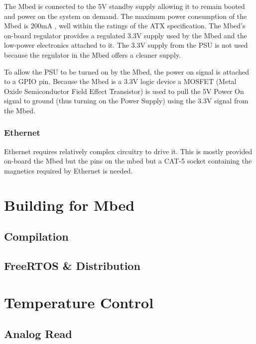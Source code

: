 				The Mbed is connected to the 5V standby supply allowing it to remain
				booted and power on the system on demand. The maximum power consumption
				of the Mbed is 200mA \cite{mbed}, well within the ratings of the ATX
				specification. The Mbed's on-board regulator provides a regulated 3.3V
				supply used by the Mbed and the low-power electronics attached to it.
				The 3.3V supply from the PSU is not used because the regulator in the
				Mbed offers a cleaner supply.
				
				To allow the PSU to be turned on by the Mbed, the power on signal is
				attached to a GPIO pin.  Because the Mbed is a 3.3V logic device a
				MOSFET (Metal Oxide Semiconductor Field Effect Transistor) is used to
				pull the 5V Power On signal to ground (thus turning on the Power Supply)
				using the 3.3V signal from the Mbed.
		
			\subsubsection{Ethernet}
				
				Ethernet requires relatively complex circuitry to drive it. This is
				mostly provided on-board the Mbed but the pins on the mbed but a
				CAT-5 socket containing the magnetics required by Ethernet is needed.
				
	
	\section{Building for Mbed}
		
		\subsection{Compilation}
		
		\subsection{FreeRTOS \& \uIP{} Distribution}
	
	\section{Temperature Control}
		
		\subsection{Analog Read}
		
